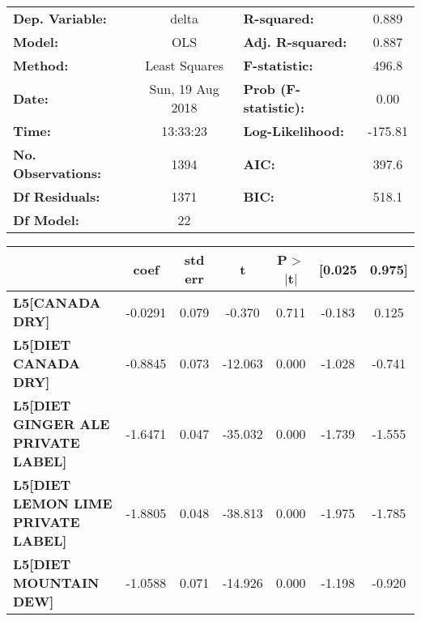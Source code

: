 \begin{center}
\begin{tabular}{lclc}
\toprule
\textbf{Dep. Variable:}                    &      delta       & \textbf{  R-squared:         } &     0.889   \\
\textbf{Model:}                            &       OLS        & \textbf{  Adj. R-squared:    } &     0.887   \\
\textbf{Method:}                           &  Least Squares   & \textbf{  F-statistic:       } &     496.8   \\
\textbf{Date:}                             & Sun, 19 Aug 2018 & \textbf{  Prob (F-statistic):} &     0.00    \\
\textbf{Time:}                             &     13:33:23     & \textbf{  Log-Likelihood:    } &   -175.81   \\
\textbf{No. Observations:}                 &        1394      & \textbf{  AIC:               } &     397.6   \\
\textbf{Df Residuals:}                     &        1371      & \textbf{  BIC:               } &     518.1   \\
\textbf{Df Model:}                         &          22      & \textbf{                     } &             \\
\bottomrule
\end{tabular}
\begin{tabular}{lcccccc}
                                           & \textbf{coef} & \textbf{std err} & \textbf{t} & \textbf{P$>$$|$t$|$} & \textbf{[0.025} & \textbf{0.975]}  \\
\midrule
\textbf{L5[CANADA DRY]}                    &      -0.0291  &        0.079     &    -0.370  &         0.711        &       -0.183    &        0.125     \\
\textbf{L5[DIET CANADA DRY]}               &      -0.8845  &        0.073     &   -12.063  &         0.000        &       -1.028    &       -0.741     \\
\textbf{L5[DIET GINGER ALE PRIVATE LABEL]} &      -1.6471  &        0.047     &   -35.032  &         0.000        &       -1.739    &       -1.555     \\
\textbf{L5[DIET LEMON LIME PRIVATE LABEL]} &      -1.8805  &        0.048     &   -38.813  &         0.000        &       -1.975    &       -1.785     \\
\textbf{L5[DIET MOUNTAIN DEW]}             &      -1.0588  &        0.071     &   -14.926  &         0.000        &       -1.198    &       -0.920     \\

\end{tabular}
\end{center}
